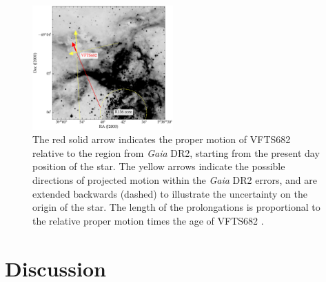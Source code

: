 \documentclass[apjl,twocolumn]{emulateapj}
\newcommand{\todo}[1]{{\large $\blacksquare$~\textbf{\color{red}[#1]}}~$\blacksquare$}
\newcommand{\SdM}[1]{{{\color{brown}{#1}}}}
\begin{document}





\begin{figure}%
  \centering
  \includegraphics[width=0.48\textwidth]{./figures/main_plot_good_gaia_only}  
  \caption{\SdM{I don't see a reason why we would not show the HST data, except for wanting to hide it maybe.  Let's sit together and find a good way to plot both.  (Hope you still have the script to show the HST direction. )}  The red solid arrow indicates the proper motion of VFTS682 
    relative to the region from \emph{Gaia} DR2, starting from the present day position of
    the star. The yellow arrows indicate the possible
    directions of projected motion within the \emph{Gaia} DR2 errors, and are extended
    backwards (dashed) to illustrate the uncertainty on the origin of the
    star. The length of the prolongations is proportional to the relative proper motion
    times the age of VFTS682 \citep[$1.0\pm0.2$\,Myr,][]{schneider:18}.
  }
  
  \label{fig:main}
\end{figure}


\section{Discussion}
\label{sec:discussion}
\end{document}
